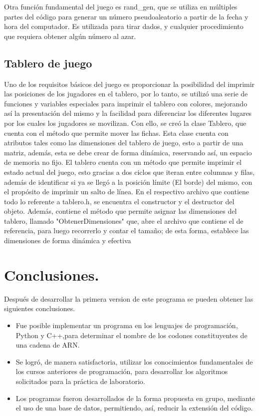 	Otra función fundamental del juego es rand_gen, que se utiliza en múltiples partes del
código para generar un número pseudoaleatorio a partir de la fecha y hora del computador. Es 
utilizada para tirar dados, y cualquier procedimiento que requiera obtener algún número al azar.

\subsection{Tablero de juego}

	Uno de los requisitos básicos del juego es proporcionar la posibilidad del imprimir las
posiciones de los jugadores en el tablero, por lo tanto, se utilizó una serie de funciones y 
variables especiales para imprimir el tablero con colores, mejorando así la presentación del mismo
y la facilidad para diferenciar los diferentes lugares por los cuales los jugadores se movilizan.
Con ello, se creó la clase Tablero, que cuenta con el método que permite mover las fichas. Esta
clase cuenta con atributos tales como las dimensiones del tablero de juego, esto a partir de una
matriz, además, esta se debe crear de forma dinámica, reservando así, un espacio de memoria no 
fijo.
	El tablero cuenta con un método que permite imprimir el estado actual del juego, esto
gracias a dos ciclos que iteran entre columnas y filas, además de identificar si ya se llegó a 
la posición límite (El borde) del mismo, con el propósito de imprimir un salto de línea.
	En el respectivo archivo que contiene todo lo referente a tablero.h, se encuentra el 
constructor y el destructor del objeto. Además, contiene el método que permite asignar las
dimensiones del tablero, llamado "ObtenerDimensiones" que, abre el archivo que contiene el
de referencia, para luego recorrerlo y contar el tamaño; de esta forma, establece las 
dimensiones de forma dinámica y efectiva

 
\section{Conclusiones.}
Después de desarrollar la primera version de este programa se pueden obtener las siguientes conclusiones.
\begin{itemize}
	\item Fue posible implementar un programa en los lenguajes de programación, Python y C++,para determinar el nombre de los codones constituyentes de una cadena de ARN.
	\item Se logró, de manera satisfactoria, utilizar los conocimientos fundamentales de los cursos anteriores de programación, para desarrollar los algoritmos solicitados para la práctica de laboratorio.
	\item Los programas fueron desarrollados de la forma propuesta en grupo, mediante el uso de una base de datos, permitiendo, así, reducir la extensión del código.
\end{itemize}
